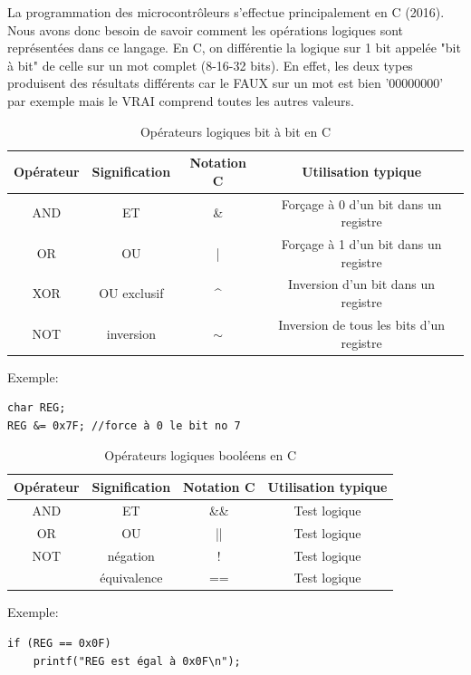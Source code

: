 La programmation des microcontrôleurs s'effectue principalement en C (2016). Nous avons donc besoin de savoir comment les opérations logiques sont représentées dans ce langage. En C, on différentie la logique sur 1 bit appelée "bit à bit" de celle sur un mot complet (8-16-32 bits). En effet, les deux types produisent des résultats différents car le FAUX sur un mot est bien '00000000' par exemple mais le VRAI comprend toutes les autres valeurs.


\begin{table}[!htbp]
\begin{center}
\begin{tabular}{|c|c|c|c|}
\hline
Opérateur & Signification & Notation C & Utilisation typique\\
\hline
AND & ET & \& & Forçage à 0 d'un bit dans un registre\\
OR & OU & | & Forçage à 1 d'un bit dans un registre\\
XOR & OU exclusif & \^{} & Inversion d'un bit dans un registre\\
NOT & inversion & $\sim$ & Inversion de tous les bits d'un registre\\
\hline
\end{tabular}
\end{center}
\caption{Opérateurs logiques bit à bit en C}
\end{table}

Exemple: 
\lstset{style=customc}
\begin{lstlisting}
char REG;
REG &= 0x7F; //force à 0 le bit no 7
\end{lstlisting}

\begin{table}[!htbp]
\begin{center}
\begin{tabular}{|c|c|c|c|}
\hline
Opérateur & Signification & Notation C & Utilisation typique\\
\hline
AND & ET & \&\& & Test logique\\
OR & OU & || & Test logique\\
NOT & négation & ! & Test logique\\
 & équivalence & == & Test logique\\
\hline
\end{tabular}
\end{center}
\caption{Opérateurs logiques booléens en C}
\end{table}

Exemple: 
\lstset{style=customc}
\begin{lstlisting}
if (REG == 0x0F)
	printf("REG est égal à 0x0F\n");
\end{lstlisting}

